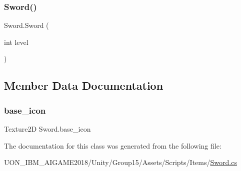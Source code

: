 \subsubsection{\texorpdfstring{Sword()}{Sword()}}
{\footnotesize\ttfamily Sword.\+Sword (\begin{DoxyParamCaption}\item[{int}]{level }\end{DoxyParamCaption})\hspace{0.3cm}{\ttfamily [inline]}}



\subsection{Member Data Documentation}
\mbox{\label{class_sword_a0436b5543c05676e2c63830b40c2c589}} 
\subsubsection{\texorpdfstring{base\_icon}{base\_icon}}
{\footnotesize\ttfamily Texture2D Sword.\+base\+\_\+icon\hspace{0.3cm}{\ttfamily [static]}}



The documentation for this class was generated from the following file\+:\begin{DoxyCompactItemize}
\item 
U\+O\+N\+\_\+\+I\+B\+M\+\_\+\+A\+I\+G\+A\+M\+E2018/\+Unity/\+Group15/\+Assets/\+Scripts/\+Items/\mbox{\hyperlink{_sword_8cs}{Sword.\+cs}}\end{DoxyCompactItemize}
